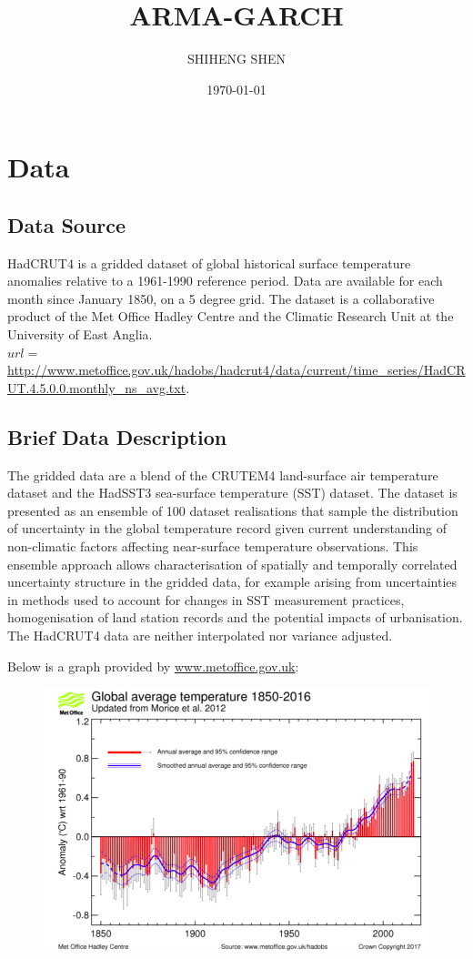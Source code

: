 \documentclass[a4paper, 11pt]{article}
\title{ARMA-GARCH}
\author{SHIHENG SHEN}
\date{\today}
\begin{document}
\maketitle

\section{Data}
\subsection{Data Source}
HadCRUT4 is a gridded dataset of global historical surface temperature anomalies relative to a 1961-1990 reference period. Data are available for each month since January 1850, on a 5 degree grid. The dataset is a collaborative product of the Met Office Hadley Centre and the Climatic Research Unit at the University of East Anglia. \\ $url = $\url{http://www.metoffice.gov.uk/hadobs/hadcrut4/data/current/time_series/HadCRUT.4.5.0.0.monthly_ns_avg.txt}.
\subsection{Brief Data Description}
The gridded data are a blend of the CRUTEM4 land-surface air temperature dataset and the HadSST3 sea-surface temperature (SST) dataset. The dataset is presented as an ensemble of 100 dataset realisations that sample the distribution of uncertainty in the global temperature record given current understanding of non-climatic factors affecting near-surface temperature observations. This ensemble approach allows characterisation of spatially and temporally correlated uncertainty structure in the gridded data, for example arising from uncertainties in methods used to account for changes in SST measurement practices, homogenisation of land station records and the potential impacts of urbanisation.
The HadCRUT4 data are neither interpolated nor variance adjusted.\par
Below is a graph provided by \url{www.metoffice.gov.uk}:
\begin{figure}[H]
\centering
\includegraphics[scale=.30]{global.png}
\end{figure} 
\end{document}
